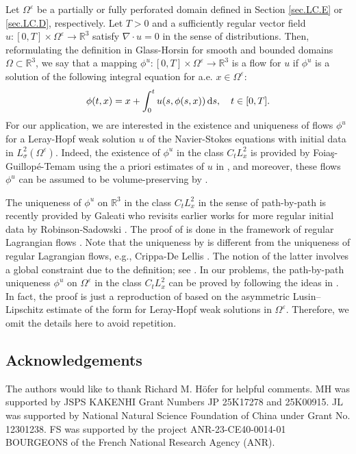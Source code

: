 \documentclass[11pt,a4paper]{article}
\numberwithin{equation}{section}
\newcommand{\R}{\mathbb{R}}
\newcommand{\dd}{\,{\rm d}}
\newcommand{\eps}{\varepsilon}
\begin{document}
Let $\Omega^\eps$ be a partially or fully perforated domain defined in Section \ref{sec.LC.E} or \ref{sec.LC.D}, respectively. Let $T > 0$ and a sufficiently regular vector field $u: [0,T]\times \Omega^\eps\rightarrow \R^3$ satisfy $\nabla\cdot u=0$ in the sense of distributions. Then, reformulating the definition in Glass-Horsin \cite[Section 1.2]{GlaHor12} for smooth and bounded domains $\Omega\subset\R^3$, we say that a mapping $\phi^u: [0,T]\times \Omega^\eps \rightarrow \R^3$ is a flow for $u$ if $\phi^u$ is a solution of the following integral equation for a.e. $x\in \Omega^\eps$: 
\begin{equation}\label{eq.integral}
    \phi(t,x) = x + \int_{0}^{t} u(s,\phi(s,x)) \dd s, \quad t\in [0,T]. 
\end{equation}
For our application, we are interested in the existence and uniqueness of flows $\phi^u$ for a Leray-Hopf weak solution $u$ of the Navier-Stokes equations with initial data in $L^2_\sigma(\Omega^\eps)$. 
Indeed, the existence of $\phi^u$ in the class $C_t L^2_x$ is provided by Foia\c{s}-Guillop\'e-Temam \cite[Theorem 2.1]{FGT85} using the a priori estimates of $u$ in \cite{FGT81}, and moreover, these flows $\phi^u$ can be assumed to be volume-preserving by \cite[Theorem 3.1]{FGT85}. 


The uniqueness of $\phi^u$ on $\R^3$ in the class $C_t L^2_x$ in the sense of path-by-path is recently provided by Galeati \cite{Gal25} who revisits earlier works for more regular initial data by Robinson-Sadowski \cite{RobSad2009b,RobSad2009a}. The proof of \cite{Gal25} is done in the framework of regular Lagrangian flows \cite{DiPLio89,Amb04,CriDel08,BCD21,Inv23}. Note that the uniqueness by \cite{Gal25} is different from the uniqueness of regular Lagrangian flows, e.g., Crippa-De Lellis \cite[Corollary 3.7]{CriDel08}. The notion of the latter involves a global constraint due to the definition; see \cite{BCD21}. In our problems, the path-by-path uniqueness $\phi^u$ on $\Omega^\eps$ in the class $C_t L^2_x$ can be proved by following the ideas in \cite{BCD21,Gal25}. In fact, the proof is just a reproduction of \cite[Proof of Corollary 10.1]{BCD21} based on the asymmetric Lusin–Lipschitz estimate of the form \cite[Corollary 4.3]{Gal25} for Leray-Hopf weak solutions in $\Omega^\eps$. Therefore, we omit the details here to avoid repetition.


\subsection*{Acknowledgements}
The authors would like to thank Richard M. H\"{o}fer for helpful comments. 
MH was supported by JSPS KAKENHI Grant Numbers JP 25K17278 and 25K00915. 
JL was supported by National Natural Science Foundation of China under Grant No. 12301238. 
FS was supported by the project ANR-23-CE40-0014-01 BOURGEONS of the French National Research Agency (ANR). 


    
    
\end{document}
